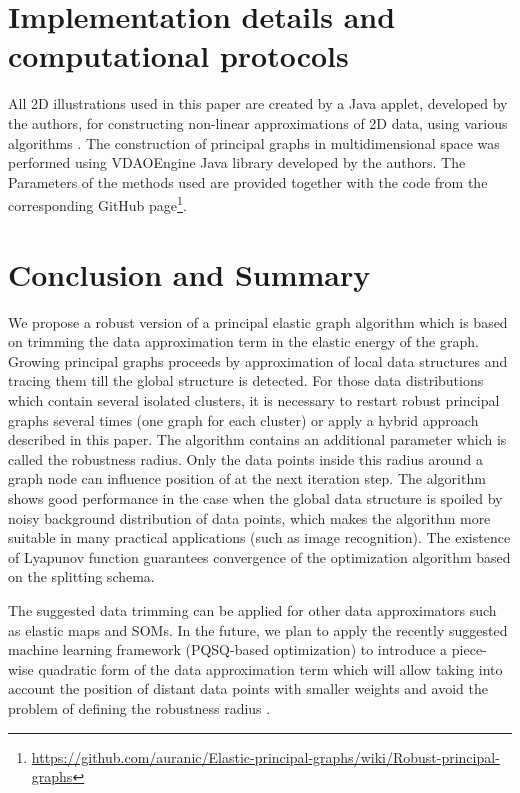 \documentclass[graybox]{archivesofdatascience}
\begin{document}
\section{Implementation details and computational protocols}\label{Implementation}

All 2D illustrations used in this paper are created by a Java applet, developed by the authors, for constructing non-linear approximations of 2D data, using various algorithms \citep{Applet}.  The construction of principal graphs in multidimensional space was performed using VDAOEngine Java library developed by the authors. The Parameters of the methods used are provided together with the code from the corresponding GitHub page\footnote{\url{https://github.com/auranic/Elastic-principal-graphs/wiki/Robust-principal-graphs}}.



\section{Conclusion and Summary}\label{Discussion}

We propose a robust version of a principal elastic graph algorithm which is based on trimming the data approximation term in the elastic energy of the graph. 
Growing principal graphs proceeds by approximation of local data structures and tracing them till the global structure is detected. 
For those data distributions which contain several isolated clusters, it is necessary to restart robust principal graphs several times
(one graph for each cluster) or apply a hybrid approach described in this paper. The algorithm contains an additional parameter  which is called the robustness radius. 
Only the data points inside this radius around a graph node  can influence position of  at the next iteration step. 
The algorithm shows good performance in the case when the global data structure is spoiled by noisy background distribution of data points, 
which makes the algorithm more suitable in many practical applications (such as image recognition). The existence of Lyapunov function guarantees convergence 
of the optimization algorithm based on the splitting schema.

The suggested data trimming can be applied for other data approximators such as elastic maps and SOMs. 
In the future, we plan to apply the recently suggested machine learning framework (PQSQ-based optimization) to introduce a piece-wise quadratic 
form of the data approximation term which will allow taking into account the position of distant data points with smaller weights and avoid the problem
of defining the robustness radius \citep{Gorban2016NeuralNetworks}.

\FloatBarrier

{
\FloatBarrier

}
\end{document}
